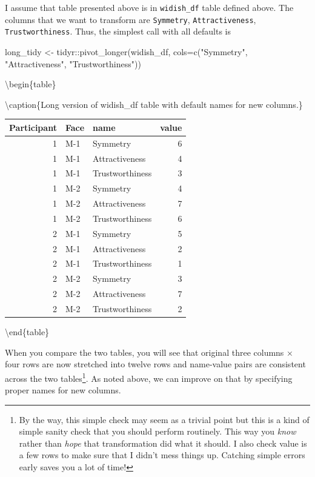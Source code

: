 \documentclass[
]{book}
\newenvironment{Shaded}{\begin{snugshade}}{\end{snugshade}}
\newcommand{\AttributeTok}[1]{\textcolor[rgb]{0.77,0.63,0.00}{#1}}
\newcommand{\FunctionTok}[1]{\textcolor[rgb]{0.00,0.00,0.00}{#1}}
\newcommand{\NormalTok}[1]{#1}
\newcommand{\OtherTok}[1]{\textcolor[rgb]{0.56,0.35,0.01}{#1}}
\newcommand{\SpecialCharTok}[1]{\textcolor[rgb]{0.00,0.00,0.00}{#1}}
\newcommand{\StringTok}[1]{\textcolor[rgb]{0.31,0.60,0.02}{#1}}
\begin{document}
I assume that table presented above is in \texttt{widish\_df} table defined above. The columns that we want to transform are \texttt{Symmetry}, \texttt{Attractiveness}, \texttt{Trustworthiness}. Thus, the simplest call with all defaults is

\begin{Shaded}
\begin{Highlighting}[]
\NormalTok{long\_tidy }\OtherTok{\textless{}{-}}\NormalTok{ tidyr}\SpecialCharTok{::}\FunctionTok{pivot\_longer}\NormalTok{(widish\_df, }
                               \AttributeTok{cols=}\FunctionTok{c}\NormalTok{(}\StringTok{"Symmetry"}\NormalTok{, }\StringTok{"Attractiveness"}\NormalTok{, }\StringTok{"Trustworthiness"}\NormalTok{))}
\end{Highlighting}
\end{Shaded}

\textbackslash begin\{table\}

\textbackslash caption\{\label{tab:unnamed-chunk-200}Long version of widish\_df table with default names for new columns.\}
\centering

\begin{tabular}[t]{r|l|l|r}
\hline
Participant & Face & name & value\\
\hline
1 & M-1 & Symmetry & 6\\
\hline
1 & M-1 & Attractiveness & 4\\
\hline
1 & M-1 & Trustworthiness & 3\\
\hline
1 & M-2 & Symmetry & 4\\
\hline
1 & M-2 & Attractiveness & 7\\
\hline
1 & M-2 & Trustworthiness & 6\\
\hline
2 & M-1 & Symmetry & 5\\
\hline
2 & M-1 & Attractiveness & 2\\
\hline
2 & M-1 & Trustworthiness & 1\\
\hline
2 & M-2 & Symmetry & 3\\
\hline
2 & M-2 & Attractiveness & 7\\
\hline
2 & M-2 & Trustworthiness & 2\\
\hline
\end{tabular}

\textbackslash end\{table\}

When you compare the two tables, you will see that original three columns × four rows are now stretched into twelve rows and name-value pairs are consistent across the two tables\footnote{By the way, this simple check may seem as a trivial point but this is a kind of simple sanity check that you should perform routinely. This way you \emph{know} rather than \emph{hope} that transformation did what it should. I also check value is a few rows to make sure that I didn't mess things up. Catching simple errors early saves you a lot of time!}. As noted above, we can improve on that by specifying proper names for new columns.
\end{document}
